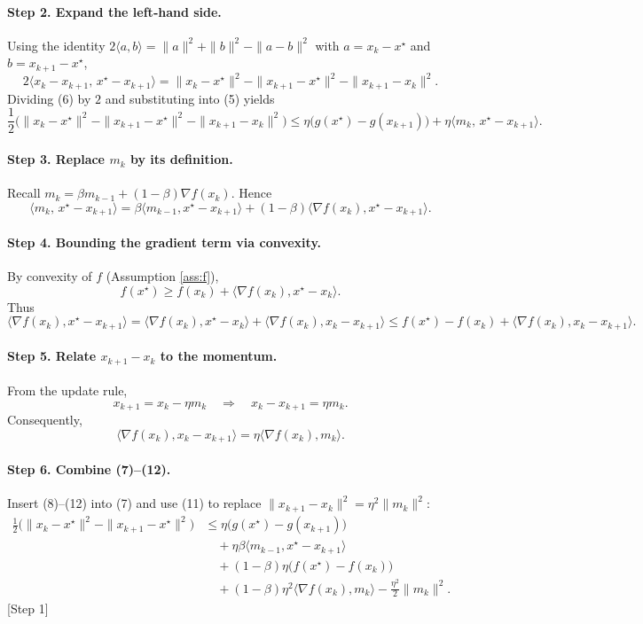 \documentclass{article}
\begin{document}
\paragraph{Step 2. Expand the left‑hand side.}
Using the identity $2\langle a,b\rangle =\|a\|^{2}+\|b\|^{2}-\|a-b\|^{2}$ with $a=x_{k}-x^{\star}$ and $b=x_{k+1}-x^{\star}$,
\[
2\langle x_{k}-x_{k+1},\,x^{\star}-x_{k+1}\rangle
= \|x_{k}-x^{\star}\|^{2}-\|x_{k+1}-x^{\star}\|^{2}-\|x_{k+1}-x_{k}\|^{2}.
\tag{6}
\]
Dividing (6) by $2$ and substituting into (5) yields
\[
\frac{1}{2}\bigl(\|x_{k}-x^{\star}\|^{2}-\|x_{k+1}-x^{\star}\|^{2}-\|x_{k+1}-x_{k}\|^{2}\bigr)
\le \eta\bigl(g(x^{\star})-g(x_{k+1})\bigr)+\eta\langle m_{k},\,x^{\star}-x_{k+1}\rangle .
\tag{7}
\]

\paragraph{Step 3. Replace $m_{k}$ by its definition.}
Recall $m_{k}= \beta m_{k-1}+ (1-\beta)\nabla f(x_{k})$. Hence
\[
\langle m_{k},\,x^{\star}-x_{k+1}\rangle
= \beta\langle m_{k-1},x^{\star}-x_{k+1}\rangle+(1-\beta)\langle\nabla f(x_{k}),x^{\star}-x_{k+1}\rangle .
\tag{8}
\]

\paragraph{Step 4. Bounding the gradient term via convexity.}
By convexity of $f$ (Assumption \ref{ass:f}),
\[
f(x^{\star})\ge f(x_{k})+\langle\nabla f(x_{k}),x^{\star}-x_{k}\rangle .
\tag{9}
\]
Thus
\[
\langle\nabla f(x_{k}),x^{\star}-x_{k+1}\rangle
= \langle\nabla f(x_{k}),x^{\star}-x_{k}\rangle+\langle\nabla f(x_{k}),x_{k}-x_{k+1}\rangle
\le f(x^{\star})-f(x_{k})+\langle\nabla f(x_{k}),x_{k}-x_{k+1}\rangle .
\tag{10}
\]

\paragraph{Step 5. Relate $x_{k+1}-x_{k}$ to the momentum.}
From the update rule,
\[
x_{k+1}=x_{k}-\eta m_{k}\quad\Longrightarrow\quad x_{k}-x_{k+1}= \eta m_{k}.
\tag{11}
\]
Consequently,
\[
\langle\nabla f(x_{k}),x_{k}-x_{k+1}\rangle = \eta\langle\nabla f(x_{k}),m_{k}\rangle .
\tag{12}
\]

\paragraph{Step 6. Combine (7)–(12).}
Insert (8)–(12) into (7) and use (11) to replace $\|x_{k+1}-x_{k}\|^{2}= \eta^{2}\|m_{k}\|^{2}$:
\begin{align}
\frac{1}{2}\bigl(\|x_{k}-x^{\star}\|^{2}-\|x_{k+1}-x^{\star}\|^{2}\bigr)
&\le \eta\bigl(g(x^{\star})-g(x_{k+1})\bigr) \nonumber\\
&\quad +\eta\beta\langle m_{k-1},x^{\star}-x_{k+1}\rangle \nonumber\\
&\quad +(1-\beta)\eta\bigl(f(x^{\star})-f(x_{k})\bigr) \nonumber\\
&\quad +(1-\beta)\eta^{2}\langle\nabla f(x_{k}),m_{k}\rangle
-\frac{\eta^{2}}{2}\|m_{k}\|^{2}.
\tag{13}
\end{align}
[Step 1]
\end{document}
